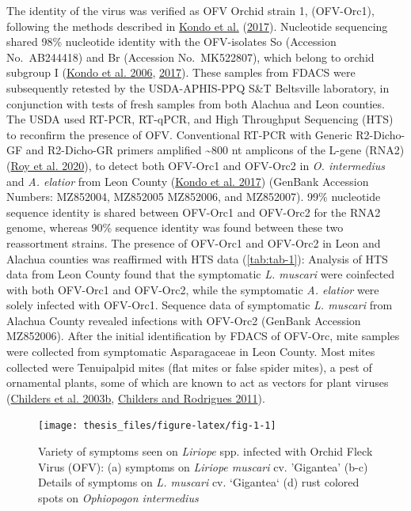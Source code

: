\documentclass[12pt,final,CPage]{ufthesis}
\begin{document}
{  The identity of the virus was verified as OFV Orchid strain 1, (OFV-Orc1), following the methods described in \protect\hyperlink{ref-Kondo2017}{Kondo et al.} (\protect\hyperlink{ref-Kondo2017}{2017}). Nucleotide sequencing shared 98\% nucleotide identity with the OFV-isolates So (Accession No.~AB244418) and Br (Accession No.~MK522807), which belong to orchid subgroup I (\protect\hyperlink{ref-Kondo2006}{Kondo et al. 2006}, \protect\hyperlink{ref-Kondo2017}{2017}). These samples from FDACS were subsequently retested by the USDA-APHIS-PPQ S\&T Beltsville laboratory, in conjunction with tests of fresh samples from both Alachua and Leon counties. The USDA used RT-PCR, RT-qPCR, and High Throughput Sequencing (HTS) to reconfirm the presence of OFV. Conventional RT-PCR with Generic R2-Dicho-GF and R2-Dicho-GR primers amplified \textasciitilde800 nt amplicons of the L-gene (RNA2) (\protect\hyperlink{ref-Roy2020}{Roy et al. 2020}), to detect both OFV-Orc1 and OFV-Orc2 in \emph{O. intermedius} and \emph{A. elatior} from Leon County (\protect\hyperlink{ref-Kondo2017}{Kondo et al. 2017}) (GenBank Accession Numbers: MZ852004, MZ852005 MZ852006, and MZ852007). 99\% nucleotide sequence identity is shared between OFV-Orc1 and OFV-Orc2 for the RNA2 genome, whereas 90\% sequence identity was found between these two reassortment strains. The presence of OFV-Orc1 and OFV-Orc2 in Leon and Alachua counties was reaffirmed with HTS data (\ref{tab:tab-1}): Analysis of HTS data from Leon County found that the symptomatic \emph{L. muscari} were coinfected with both OFV-Orc1 and OFV-Orc2, while the symptomatic \emph{A. elatior} were solely infected with OFV-Orc1. Sequence data of symptomatic \emph{L. muscari} from Alachua County revealed infections with OFV-Orc2 (GenBank Accession MZ852006). After the initial identification by FDACS of OFV-Orc, mite samples were collected from symptomatic Asparagaceae in Leon County. Most mites collected were Tenuipalpid mites (flat mites or false spider mites), a pest of ornamental plants, some of which are known to act as vectors for plant viruses (\protect\hyperlink{ref-Childers2003}{Childers et al. 2003b}, \protect\hyperlink{ref-Childers2011}{Childers and Rodrigues 2011}).
  \begin{figure}

  {\centering \texttt{[image: thesis\_files/figure-latex/fig-1-1]} 

  }

  \caption[Variety of symptoms seen on \textit{Liriope} spp. infected with Orchid Fleck Virus]{Variety of symptoms seen on \textit{Liriope} spp. infected with Orchid Fleck Virus (OFV): (a) symptoms on \textit{Liriope muscari} cv. 'Gigantea' (b-c) Details of symptoms on \textit{L. muscari} cv. `Gigantea` (d) rust colored spots on \textit{Ophiopogon intermedius}}\label{fig:fig-1}
  \end{figure}
  \begin{figure}


\end{figure}}
\end{document}

